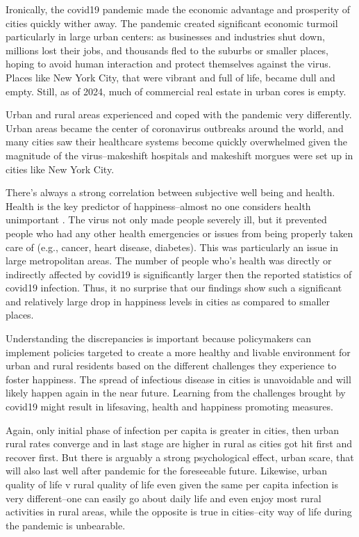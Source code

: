 \documentclass[10pt, letterpaper]{article}
\begin{document}
\begin{spacing}{1.4}
Ironically, the covid19 pandemic made the economic advantage and prosperity of
cities quickly wither away. The pandemic created significant economic turmoil
particularly in large urban centers: as businesses and industries shut down,
millions lost their jobs, and thousands fled to the suburbs or smaller places,
hoping to avoid human interaction and protect themselves against the
virus. Places like New York City, that were vibrant and full of life, became
dull and empty. Still, as of 2024, much of commercial real estate in urban cores
is empty.

Urban and rural areas experienced and coped with the pandemic very
differently. Urban areas became the center of coronavirus outbreaks around the
world, and many cities saw their healthcare systems become quickly overwhelmed
given the magnitude of the virus--makeshift hospitals and makeshift morgues were
set up in cities like New York City.

There's always a strong correlation between subjective well being and
health. Health is the key predictor of happiness--almost no one considers health
unimportant \citep[e.g.,][]{campbell76etal}. The virus not only made people severely ill, but it prevented people who had any other health emergencies or issues from being properly taken care of (e.g., cancer, heart disease, diabetes). This was particularly an issue in large metropolitan areas. The number of people who's health was directly or indirectly affected by covid19 is significantly larger then the reported statistics of covid19 infection. 
Thus, it no surprise that our findings show such a significant and relatively
large drop in happiness levels in cities as compared to smaller places.

Understanding the discrepancies is important because policymakers can implement
policies targeted to create a more healthy and livable environment for urban and
rural residents based on the different challenges they experience to foster
happiness. The spread of infectious disease in cities is unavoidable and will
likely happen again in the near future. Learning from the challenges brought by
covid19 might result in lifesaving, health and happiness promoting measures.


Again, only initial phase of infection per capita is greater in cities, then urban rural rates converge and in last stage are higher in rural as cities got hit first and recover first. But there is arguably a strong psychological effect, urban scare, that will also last well after pandemic for the foreseeable future. Likewise, urban quality of life v rural quality of life even given the same per capita infection is very different--one can easily go about daily life and even enjoy most rural activities in rural areas, while the opposite is true in cities--city way of life during the pandemic is unbearable.


\end{spacing}
\end{document}
